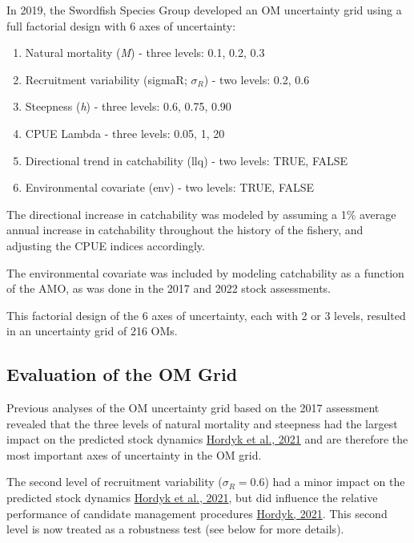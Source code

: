 \documentclass[
]{article}
\begin{document}
In 2019, the Swordfish Species Group developed an OM uncertainty grid using a full factorial design with 6 axes of uncertainty:

\begin{enumerate}
\def\labelenumi{\arabic{enumi}.}
\item
  Natural mortality (\emph{M}) - three levels: 0.1, 0.2, 0.3
\item
  Recruitment variability (sigmaR; \(\sigma_R\)) - two levels: 0.2, 0.6
\item
  Steepness (\emph{h}) - three levels: 0.6, 0.75, 0.90
\item
  CPUE Lambda - three levels: 0.05, 1, 20
\item
  Directional trend in catchability (llq) - two levels: TRUE, FALSE
\item
  Environmental covariate (env) - two levels: TRUE, FALSE
\end{enumerate}

The directional increase in catchability was modeled by assuming a 1\% average annual increase in catchability throughout the history of the fishery, and adjusting the CPUE indices accordingly.

The environmental covariate was included by modeling catchability as a function of the AMO, as was done in the 2017 and 2022 stock assessments.

This factorial design of the 6 axes of uncertainty, each with 2 or 3 levels, resulted in an uncertainty grid of 216 OMs.

\hypertarget{evaluation-of-the-om-grid}{%
\subsection{Evaluation of the OM Grid}\label{evaluation-of-the-om-grid}}

Previous analyses of the OM uncertainty grid based on the 2017 assessment revealed that the three levels of natural mortality and steepness had the largest impact on the predicted stock dynamics \href{https://iccat.github.io/nswo-mse/SCRS_Papers//Hordyk_et_al_SCRS_2021_099.pdf}{Hordyk et al., 2021} and are therefore the most important axes of uncertainty in the OM grid.

The second level of recruitment variability (\(\sigma_R = 0.6\)) had a minor impact on the predicted stock dynamics \href{https://iccat.github.io/nswo-mse/SCRS_Papers//Hordyk_et_al_SCRS_2021_099.pdf}{Hordyk et al., 2021}, but did influence the relative performance of candidate management procedures \href{https://iccat.github.io/nswo-mse/SCRS_Papers//Hordyk_SCRS_2021_161.pdf}{Hordyk, 2021}. This second level is now treated as a robustness test (see below for more details).
\end{document}
